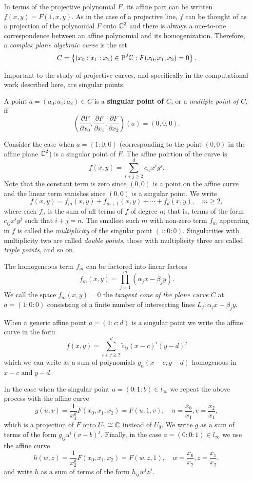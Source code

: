 In terms of the projective polynomial $F$, its affine part can be written
$f(x,y) = F(1,x,y)$. As in the case of a projective line, $f$ can be thought of
as a projection of the polynomial $F$ onto $\operatorname{\mathbb{C}}^2$ and there is always a
one-to-one correspondence between an affine polynomial and its homogenization.
Therefore, a {\it complex plane algebraic curve} is the set
\[
  C = \left\{ (x_0 : x_1 : x_2) \in \mathrm{P}^2 \!\operatorname{\mathbb{C}} : F(x_0,x_1,x_2) = 0 \right\}.
\]

Important to the study of projective curves, and specifically in the
computational work described here, are singular points.
\begin{definition} \label{def: singular-point} A point $a = (a_0 : a_1 : a_2)
  \in C$ is a {\bf singular point of $C$}, or a {\it multiple point of $C$}, if
  \[
    \left( \frac{\partial F}{\partial x_0},
      \frac{\partial F}{\partial x_1},
      \frac{\partial F}{\partial x_2} \right) (a) = (0,0,0).
  \]
\end{definition}
Consider the case when $a = (1 : 0 : 0)$ (corresponding to the point $(0,0)$ in
the affine plane $\operatorname{\mathbb{C}}^2$) is a singular point of $F$. The affine poirtion of the
curve is
\[
  f(x,y) = \sum_{i+j \geq 2}^d c_{ij} x^iy^j.
\]
Note that the constant term is zero since $(0, 0)$ is a point on the affine
curve and the linear term vanishes since $(0,0)$ is a singular point. We write
\[
  f(x,y) = f_m(x,y) + f_{m+1}(x,y) + \cdots + f_d(x,y), \quad m \geq 2,
\]
where each $f_n$ is the sum of all terms of $f$ of degree $n$; that is, terms of
the form $c_{ij}x^iy^j$ such that $i+j=n$. The smallest such $m$ with non-zero
term $f_m$ appearing in $f$ is called the {\it multiplicity} of the singular
point $(1 : 0 : 0)$. Singularities with multiplicity two are called {\it double
  points}, those with multiplicity three are called {\it triple points}, and so
on.

The homogeneous term $f_m$ can be factored into linear factors
\[
  f_m(x,y) = \prod_{j=1}^m (\alpha_j x - \beta_j y).
\]
We call the space $f_m(x,y) = 0$ the {\it tangent cone of the plane curve $C$}
at $a = (1 : 0 : 0)$ consistsing of a finite number of intersecting lines $L_j :
\alpha_j x - \beta_j y$.

When a generic affine point $a = (1 : c : d)$ is a singular point we write the
affine curve in the form
\[
  f(x,y) = \sum_{i+j \geq 2}^d \tilde{c}_{ij} (x-c)^i(y-d)^j
\]
which we can write as a sum of polynomials $g_n(x-c,y-d)$ homogenous in $x-c$
and $y-d$.

In the case when the singular point $a = (0 : 1 : b) \in l_\infty$ we repeat the
above process with the affine curve
\[
  g(u,v) = \frac{1}{x_1^d} F(x_0, x_1, x_2) = F(u,1,v), \quad u =
  \frac{x_0}{x_1}, v = \frac{x_2}{x_1},
\]
which is a projection of $F$ onto $U_1 \cong \operatorname{\mathbb{C}}$ instead of $U_0$. We write $g$
as a sum of terms of the form $g_{ij}u^i(v-b)^j$. Finally, in the case $a = (0 :
0 : 1) \in l_\infty$ we use the affine curve
\[
  h(w,z) = \frac{1}{x_2^d} F(x_0, x_1, x_2) = F(w,z,1), \quad w =
  \frac{x_0}{x_2}, z = \frac{x_1}{x_2},
\]
and write $h$ as a sum of terms of the form $h_{ij}w^iz^j$.

